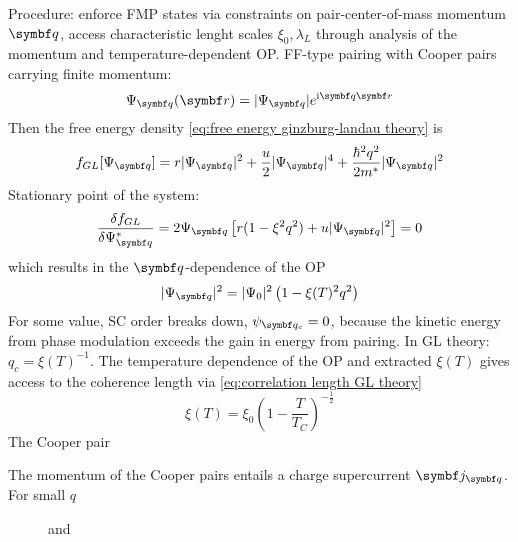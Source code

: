 \documentclass[../notes.tex]{subfiles}
\begin{document}
Procedure: enforce FMP states via constraints on pair-center-of-mass momentum \(\vb{q}\), access characteristic lenght scales \(\xi_0, \lambda_L\) through analysis of the momentum and temperature-dependent OP\@.
FF-type pairing with Cooper pairs carrying finite momentum:
\begin{equation}
	\Psi_{\vb{q}} (\vb{r}) = \vert \Psi_{\vb{q}} \vert e^{\iu \vb{q} \vb{r}}
\end{equation}
Then the free energy density \cref{eq:free energy ginzburg-landau theory} is
\begin{equation}
	f_{GL} [\Psi_{\vb{q}}] = r \vert \Psi_{\vb{q}} \vert^2 + \frac{u}{2} \vert \Psi_{\vb{q}} \vert^4 + \frac{\hbar^2 q^2}{2 m^*} \vert \Psi_{\vb{q}} \vert^2
\end{equation}
Stationary point of the system:
\begin{equation}
	\fdv{f_{GL}}{\Psi_{\vb{q}}^*} = 2 \Psi_{\vb{q}} \left[r (1 - \xi^2 q^2) + u \vert \Psi_{\vb{q}} \vert^2\right] = 0
\end{equation}
which results in the \(\vb{q}\)-dependence of the OP
\begin{equation}
	\vert \Psi_{\vb{q}} \vert^2 = \vert \Psi_{0} \vert^2 \left(1 - \xi(T)^2 q^2\right)
\end{equation}
For some value, SC order breaks down, \(\psi_{\vb{q}_c} = 0\), because the kinetic energy from phase modulation exceeds the gain in energy from pairing.
In GL theory: \(q_c = \xi(T)^{-1}\).
The temperature dependence of the OP and extracted \(\xi(T)\) gives access to the coherence length via \cref{eq:correlation length GL theory}
\begin{equation}
	\xi(T) = \xi_0 \left(1 - \frac{T}{T_C}\right)^{-\frac{1}{2}}
\end{equation}
The Cooper pair


The momentum of the Cooper pairs entails a charge supercurrent \(\vb{j}_{\vb{q}}\).
For small \(q\)

\begin{figure}[t]
	\centering
	\begin{subfigure}[b]{0.5\textwidth}
		\caption{\hfill\null}\label{sfig:Ginzburg Landau OP vs q}
		\centering
		
	\end{subfigure}%
	\hfill
	\begin{subfigure}[b]{0.5\textwidth}
		\centering
		\caption{\hfill\null}\label{sfig:Ginzburg Landau current vs q}
		
	\end{subfigure}
	\caption{ and } 
	\label{fig:Ginzburg Landau OP and current vs q}
\end{figure}
\end{document}
